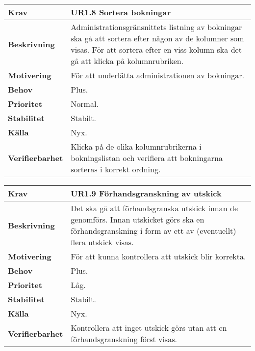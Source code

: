 \documentclass[a4paper, twoside, 11pt, titlepage]{article}
\begin{document}
		\begin{tabular} { p{2.6cm} p{12.5cm} }
			\hline
			\sffamily\textbf{Krav} & \sffamily\textbf{UR1.8 Sortera bokningar  } \\
			\hline
			\sffamily\textbf{Beskrivning} & Administrationsgränsnittets listning av bokningar ska gå att sortera efter någon av de kolumner som visas. För att sortera efter en viss kolumn ska det gå att klicka på kolumnrubriken.  \\
			\hline
			\sffamily\textbf{Motivering} & För att underlätta administrationen av bokningar.  \\
			\hline
			\sffamily\textbf{Behov} & Plus.  \\
			\hline
			\sffamily\textbf{Prioritet} & Normal.  \\
			\hline
			\sffamily\textbf{Stabilitet} & Stabilt.  \\
			\hline
			\sffamily\textbf{Källa} & Nyx.  \\
			\hline
			\sffamily\textbf{Verifierbarhet} & Klicka på de olika kolumnrubrikerna i bokningslistan och verifiera att bokningarna sorteras i korrekt ordning.  \\
			\hline
		\end{tabular}
		\vspace{6mm}

		\begin{tabular} { p{2.6cm} p{12.5cm} }
			\hline
			\sffamily\textbf{Krav} & \sffamily\textbf{UR1.9 Förhandsgranskning av utskick  } \\
			\hline
			\sffamily\textbf{Beskrivning} & Det ska gå att förhandsgranska utskick innan de genomförs. Innan utskicket görs ska en förhandsgranskning i form av ett av (eventuellt) flera utskick visas.  \\
			\hline
			\sffamily\textbf{Motivering} & För att kunna kontrollera att utskick blir korrekta.  \\
			\hline
			\sffamily\textbf{Behov} & Plus.  \\
			\hline
			\sffamily\textbf{Prioritet} & Låg.  \\
			\hline
			\sffamily\textbf{Stabilitet} & Stabilt.  \\
			\hline
			\sffamily\textbf{Källa} & Nyx.  \\
			\hline
			\sffamily\textbf{Verifierbarhet} & Kontrollera att inget utskick görs utan att en förhandsgranskning först visas.  \\
			\hline
		\end{tabular}
		\vspace{6mm}
\end{document}
